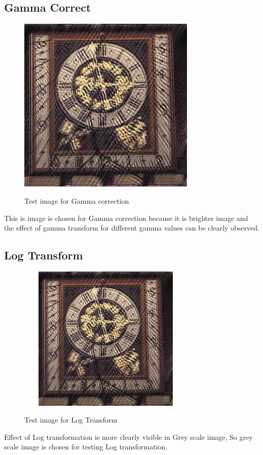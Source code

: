 \documentclass{article}
\begin{document}
\subsection{Gamma Correct}
\begin{figure}[htb]

\begin{minipage}[b]{1.0\linewidth}
  \centering
  \centerline{\includegraphics[width=8.5cm]{temp.jpg}}
  \centerline{Test image for Gamma correction\cite{WEBSITE:12}}\medskip
\end{minipage}
%
\end{figure}
This is image is chosen for Gamma correction because it is brighter image and the effect of gamma transform for different gamma values can be clearly observed.

\subsection{Log Transform}
\begin{figure}[htb]

\begin{minipage}[b]{1.0\linewidth}
  \centering
  \centerline{\includegraphics[width=8.5cm,height=7cm,keepaspectratio]{temp.jpg}}
  \centerline{Test image for Log Transform\cite{WEBSITE:16}}\medskip
\end{minipage}
%
\end{figure}
Effect of Log transformation is more clearly visible in Grey scale image, So grey scale image is chosen for testing Log transformation. 
\end{document}
